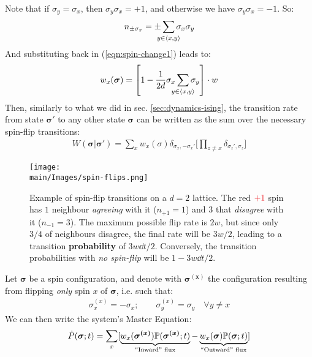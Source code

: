 \documentclass[../../main.tex]{subfiles}
\begin{document}
Note that if $\sigma_y = \sigma_x$, then $\sigma_y \sigma_x = +1$, and otherwise we have $\sigma_y \sigma_x = -1$. So:
\begin{align*}
    n_{\pm \sigma_x} = \pm \sum_{\mathclap{y \in \langle x,y \rangle}} \sigma_x \sigma_y
\end{align*}
And substituting back in (\ref{eqn:spin-change1}) leads to:
\begin{align}\label{eqn:spin-change2}
    w_x(\bm{\sigma}) = \left[1 - \frac{1}{2d} \sigma_x \sum_{\mathclap{y \in \langle x,y \rangle}} \sigma_y \right] \cdot w
\end{align}
Then, similarly to what we did in sec. \ref{sec:dynamics-ising}, the transition rate from state $\bm{\sigma'}$ to any other state $\bm{\sigma}$ can be written as the sum over the necessary spin-flip transitions:
\begin{align*}
    W(\bm{\sigma}|\bm{\sigma'}) = \sum_x w_x(\sigma) \delta_{\sigma_x, -\sigma_x'}\Big[ \prod_{z \neq x} \delta_{\sigma_z', \sigma_z} \Big]
\end{align*}

\begin{figure}[H]
    \centering
    \texttt{[image: \\main/Images/spin-flips.png]}
    \caption{Example of spin-flip transitions on a $d=2$ lattice. The red $\textcolor{Red}{+1}$ spin has $1$ neighbour \textit{agreeing} with it ($n_{+1} = 1$) and $3$ that \textit{disagree} with it ($n_{-1} = 3$). The maximum possible flip rate is $2w$, but since only $3/4$ of neighbours disagree, the final rate will be $3w/2$, leading to a transition \textbf{probability} of $3w \dd{t}/2$. Conversely, the transition probabilities with \textit{no spin-flip} will be $1-3w\dd{t}/2$.}
    \label{fig:spin-flips}
\end{figure}

Let $\bm{\sigma}$ be a spin configuration, and denote with $\bm{\sigma^{(x)}}$ the configuration resulting from flipping \textit{only} spin $x$ of $\bm{\sigma}$, i.e. such that:
\begin{align*}
    \sigma_x^{(x)} = -\sigma_x; \qquad \sigma_y^{(x)} = \sigma_y \quad \forall y \neq x
\end{align*} 
We can then write the system's Master Equation:
\begin{align}\label{eqn:voting-ME}
    \dot{P}(\bm{\sigma};t) = \sum_x [\underbrace{w_x(\bm{\sigma^{(x)}}) \mathbb{P}(\bm{\sigma^{(x)}}; t)}_{\text{``Inward'' flux}}  - \underbrace{w_x(\bm{\sigma}) \mathbb{P}(\bm{\sigma}; t)}_{\text{``Outward'' flux}} ]
\end{align}
\end{document}

